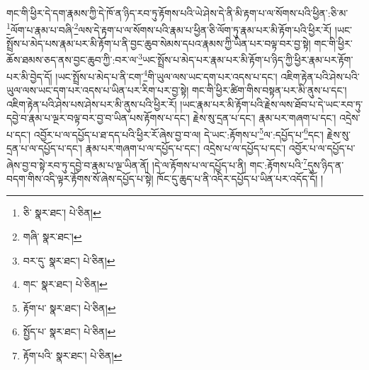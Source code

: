 གང་གི་ཕྱིར་དེ་དག་རྣམས་ཀྱི་དེ་ཁོ་ན་ཉིད་རབ་ཏུ་རྟོགས་པའི་ཡེ་ཤེས་དེ་ནི་མི་རྟག་པ་ལ་སོགས་པའི་ཕྱིན་:ཅི་མ་\footnote{ཅི་  སྣར་ཐང་།  པེ་ཅིན། }ལོག་པ་རྣམ་པ་བཞི་\footnote{གཞི་  སྣར་ཐང་། }ལས་དེ་རྟག་པ་ལ་སོགས་པའི་རྣམ་པ་ཕྱིན་ཅི་ལོག་ཏུ་རྣམ་པར་མི་རྟོག་པའི་ཕྱིར་རོ། །ཡང་སྤྲོས་པ་མེད་པས་རྣམ་པར་མི་རྟོག་པ་ནི་བྱང་ཆུབ་སེམས་དཔའ་རྣམས་ཀྱི་ཡིན་པར་བལྟ་བར་བྱ་སྟེ། གང་གི་ཕྱིར་ཆོས་ཐམས་ཅད་ནས་བྱང་ཆུབ་ཀྱི་:བར་ལ་\footnote{བར་དུ་  སྣར་ཐང་།  པེ་ཅིན། }ཡང་སྤྲོས་པ་མེད་པར་རྣམ་པར་མི་རྟོག་པ་ཉིད་ཀྱི་ཕྱིར་རྣམ་པར་རྟོག་པར་མི་བྱེད་དོ། །ཡང་སྤྲོས་པ་མེད་པ་ནི་ངག་\footnote{གང་  སྣར་ཐང་།  པེ་ཅིན། }གི་ཡུལ་ལས་ཡང་དག་པར་འདས་པ་དང་། འཇིག་རྟེན་པའི་ཤེས་པའི་ཡུལ་ལས་ཡང་དག་པར་འདས་པ་ཡིན་པར་རིག་པར་བྱ་སྟེ། གང་གི་ཕྱིར་ཚིག་གིས་བསྟན་པར་མི་ནུས་པ་དང་། འཇིག་རྟེན་པའི་ཤེས་པས་ཤེས་པར་མི་ནུས་པའི་ཕྱིར་རོ། །ཡང་རྣམ་པར་མི་རྟོག་པའི་རྗེས་ལས་ཐོབ་པ་དེ་ཡང་རབ་ཏུ་དབྱེ་བ་རྣམ་པ་ལྔར་བལྟ་བར་བྱ་བ་ཡིན་པས་རྟོགས་པ་དང་། རྗེས་སུ་དྲན་པ་དང་། རྣམ་པར་གཞག་པ་དང་། འདྲེས་པ་དང་། འབྱོར་པ་ལ་དཔྱོད་པ་ཐ་དད་པའི་ཕྱིར་རོ་ཞེས་བྱ་བ་ལ། དེ་ཡང་:རྟོགས་པ་\footnote{རྟོག་པ་  སྣར་ཐང་།  པེ་ཅིན། }ལ་:དཔྱོད་པ་\footnote{སྤྱོད་པ་  སྣར་ཐང་།  པེ་ཅིན། }དང་། རྗེས་སུ་དྲན་པ་ལ་དཔྱོད་པ་དང་། རྣམ་པར་གཞག་པ་ལ་དཔྱོད་པ་དང་། འདྲེས་པ་ལ་དཔྱོད་པ་དང་། འབྱོར་པ་ལ་དཔྱོད་པ་ཞེས་བྱ་བ་སྟེ་རབ་ཏུ་དབྱེ་བ་རྣམ་པ་ལྔ་ཡིན་ནོ། །དེ་ལ་རྟོགས་པ་ལ་དཔྱོད་པ་ནི། གང་:རྟོགས་པའི་\footnote{རྟོག་པའི་  སྣར་ཐང་།  པེ་ཅིན། }དུས་ཉིད་ན་བདག་གིས་འདི་ལྟར་རྟོགས་སོ་ཞེས་དཔྱོད་པ་སྟེ། ཁོང་དུ་ཆུད་པ་ནི་འདིར་དཔྱོད་པ་ཡིན་པར་འདོད་དོ། །
